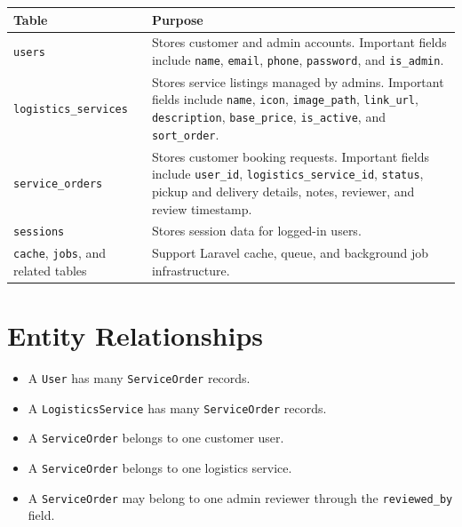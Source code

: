 \documentclass[12pt,a4paper]{report}
\begin{document}
\begin{longtable}{L{0.28\textwidth} L{0.62\textwidth}}
\toprule
\textbf{Table} & \textbf{Purpose} \\
\midrule
\texttt{users} & Stores customer and admin accounts. Important fields include \texttt{name}, \texttt{email}, \texttt{phone}, \texttt{password}, and \texttt{is\_admin}. \\
\texttt{logistics\_services} & Stores service listings managed by admins. Important fields include \texttt{name}, \texttt{icon}, \texttt{image\_path}, \texttt{link\_url}, \texttt{description}, \texttt{base\_price}, \texttt{is\_active}, and \texttt{sort\_order}. \\
\texttt{service\_orders} & Stores customer booking requests. Important fields include \texttt{user\_id}, \texttt{logistics\_service\_id}, \texttt{status}, pickup and delivery details, notes, reviewer, and review timestamp. \\
\texttt{sessions} & Stores session data for logged-in users. \\
\texttt{cache}, \texttt{jobs}, and related tables & Support Laravel cache, queue, and background job infrastructure. \\
\bottomrule
\end{longtable}

\section{Entity Relationships}

\begin{itemize}
    \item A \texttt{User} has many \texttt{ServiceOrder} records.
    \item A \texttt{LogisticsService} has many \texttt{ServiceOrder} records.
    \item A \texttt{ServiceOrder} belongs to one customer user.
    \item A \texttt{ServiceOrder} belongs to one logistics service.
    \item A \texttt{ServiceOrder} may belong to one admin reviewer through the \texttt{reviewed\_by} field.
\end{itemize}

\begin{center}
\end{center}
\end{document}
